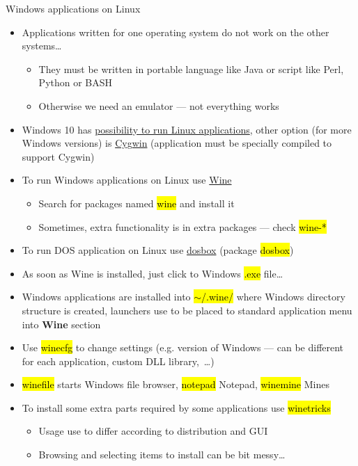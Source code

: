 \documentclass[compress, ucs, xelatex, 11pt, xcolor=svgnames, aspectratio=169,
	hyperref={
		bookmarks=true,
		unicode=true,
		colorlinks=true,
		pdftitle={Linux, command line and MetaCentrum},
		plainpages=false,
		pdfauthor={Vojtech Zeisek},
		pdfsubject={Course about use of Linux command line, writing shell scripts and using MetaCentrum of CESNET},
		pdfcreator={XeLaTeX},
		pdfkeywords={Linux, GNU, BASH, shell, command line, MetaCentrum},
		linkcolor=DarkRed, %
		anchorcolor=DarkBlue, %
		citecolor=Indigo, %
		filecolor=NavyBlue, %
		menucolor=DarkMagenta, %
		urlcolor=DarkBlue, %
		pdftex},
	url={hyphens, lowtilde} %
	]{beamer}
\renewcommand{\texttt}[1]{\hl{\ttfamily #1}}
\begin{document}
\begin{frame}[allowframebreaks]{Windows applications on Linux}
	\begin{itemize}
		\item Applications written for one operating system do not work on the other systems\ldots
		\begin{itemize}
			\item They must be written in portable language like Java or script like Perl, Python or BASH
			\item Otherwise we need an emulator --- not everything works
		\end{itemize}
		\item Windows 10 has \href{https://docs.microsoft.com/windows/wsl/install-win10}{possibility to run Linux applications}, other option (for more Windows versions) is \href{https://www.cygwin.com/}{Cygwin} (application must be specially compiled to support Cygwin)
		\item To run Windows applications on Linux use \href{https://www.winehq.org/}{Wine}
		\begin{itemize}
			\item Search for packages named \texttt{wine} and install it
			\item Sometimes, extra functionality is in extra packages --- check \texttt{wine-*}
		\end{itemize}
		\item To run DOS application on Linux use \href{https://www.dosbox.com/}{dosbox} (package \texttt{dosbox})
		\item As soon as Wine is installed, just click to Windows \texttt{*.exe} file\ldots
		\item Windows applications are installed into \texttt{$\sim$/.wine/} where Windows directory structure is created, launchers use to be placed to standard application menu into \textbf{Wine} section
		\item Use \texttt{winecfg} to change settings (e.g. version of Windows --- can be different for each application, custom DLL library,~\ldots)
		\item \texttt{winefile} starts Windows file browser, \texttt{notepad} Notepad, \texttt{winemine} Mines
		\item To install some extra parts required by some applications use \texttt{winetricks}
		\begin{itemize}
			\item Usage use to differ according to distribution and GUI
			\item Browsing and selecting items to install can be bit messy\ldots

\end{itemize}
\end{itemize}
\end{frame}
\end{document}
